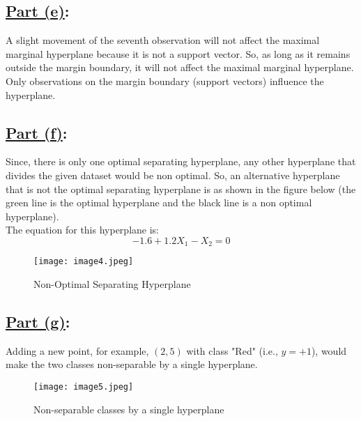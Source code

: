 \documentclass[12pt]{article}
\begin{document}
\subsection*{\underline{Part (e)}:}
A slight movement of the seventh observation will not affect the maximal marginal hyperplane because it is not a support vector. So, as long as it remains outside the margin boundary, it will not affect the maximal marginal hyperplane. Only observations on the margin boundary (support vectors) influence the hyperplane.

\subsection*{\underline{Part (f)}:}
Since, there is only one optimal separating hyperplane, any other hyperplane that divides the given dataset would be non optimal.
So, an alternative hyperplane that is not the optimal separating hyperplane is as shown in the figure below (the green line is the optimal hyperplane and the black line is a non optimal hyperplane).\\
The equation for this hyperplane is:
\[-1.6 + 1.2X_1 - X_2 = 0\]
\begin{figure}[h!] %
  \centering %
  \texttt{[image: image4.jpeg]} %
  \caption{Non-Optimal Separating Hyperplane} %
  \label{fig:your_label} %
\end{figure}

\subsection*{\underline{Part (g)}:}
Adding a new point, for example, \( (2, 5) \) with class "Red" (i.e., \( y = +1 \)), would make the two classes non-separable by a single hyperplane.
\begin{figure}[h!] %
  \centering %
  \texttt{[image: image5.jpeg]} %
  \caption{Non-separable classes by a single hyperplane} %
  \label{fig:your_label} %
\end{figure}
\end{document}
